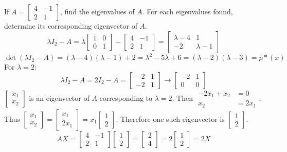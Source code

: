 \documentclass[12pt]{article}
\begin{document}
\begin{example} If $A = \begin{bmatrix} 4 & -1 \\ 2 & 1 \end{bmatrix}$, find the eigenvalues of $A$. For each eigenvalues found, determine its corresponding eigenvector of $A$. $$\lambda I_2 - A = \lambda \begin{bmatrix} 1 & 0 \\ 0 & 1 \end{bmatrix} - \begin{bmatrix} 4 & -1 \\ 2 & 1 \end{bmatrix} = \begin{bmatrix} \lambda - 4 & 1 \\ -2 & \lambda - 1 \end{bmatrix} $$ $$\det(\lambda I_2 - A) = (\lambda - 4)(\lambda - 1) + 2 = \lambda^2 - 5\lambda + 6 = (\lambda - 2)(\lambda - 3) = p*(x) $$ 
For $\lambda = 2$: $$ \lambda I_2 - A = 2I_2 - A = \begin{bmatrix} -2 & 1 \\ -2 & 1 \end{bmatrix} \rightarrow \begin{bmatrix} -2 & 1 \\ 0 & 0 \end{bmatrix} $$ 
$\begin{bmatrix} x_1 \\ x_2 \end{bmatrix}$ is an eigenvector of $A$ corresponding to $\lambda = 2$. Then $\begin{aligned} -2x_1 + x_2 &= 0 \\ x_2 &= 2x_1 \end{aligned}$. Thus $\begin{bmatrix} x_1 \\ x_2 \end{bmatrix} = \begin{bmatrix} x_1 \\ 2x_1 \end{bmatrix} = x_1\begin{bmatrix} 1 \\ 2 \end{bmatrix} $. Therefore one such eigenvector is $\begin{bmatrix} 1 \\ 2 \end{bmatrix} $. $$ AX = \begin{bmatrix} 4 & -1 \\ 2 & 1 \end{bmatrix} \begin{bmatrix} 1 \\ 2 \end{bmatrix} = \begin{bmatrix} 2 \\ 4 \end{bmatrix} = 2 \begin{bmatrix} 1 \\ 2 \end{bmatrix} = 2X $$ 

\end{example}
\end{document}
